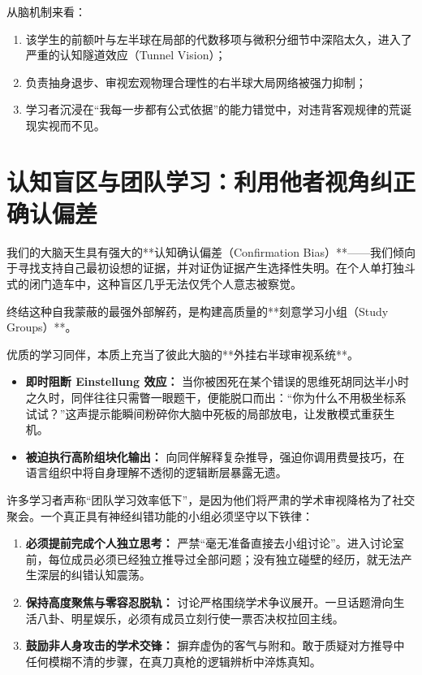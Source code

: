 \documentclass[12pt,a4paper,openany]{ctexbook}
\begin{document}
从脑机制来看：
\begin{enumerate}
    \item 该学生的前额叶与左半球在局部的代数移项与微积分细节中深陷太久，进入了严重的认知隧道效应（Tunnel Vision）；
    \item 负责抽身退步、审视宏观物理合理性的右半球大局网络被强力抑制；
    \item 学习者沉浸在“我每一步都有公式依据”的能力错觉中，对违背客观规律的荒诞现实视而不见。
\end{enumerate}

\section{认知盲区与团队学习：利用他者视角纠正确认偏差}

我们的大脑天生具有强大的**认知确认偏差（Confirmation Bias）**——我们倾向于寻找支持自己最初设想的证据，并对证伪证据产生选择性失明。在个人单打独斗式的闭门造车中，这种盲区几乎无法仅凭个人意志被察觉。

终结这种自我蒙蔽的最强外部解药，是构建高质量的**刻意学习小组（Study Groups）**。

\begin{keypoint}[团队学习的认知神经学增益]
优质的学习同伴，本质上充当了彼此大脑的**外挂右半球审视系统**。
\begin{itemize}
    \item \textbf{即时阻断 Einstellung 效应：} 当你被困死在某个错误的思维死胡同达半小时之久时，同伴往往只需瞥一眼题干，便能脱口而出：“你为什么不用极坐标系试试？”这声提示能瞬间粉碎你大脑中死板的局部放电，让发散模式重获生机。
    \item \textbf{被迫执行高阶组块化输出：} 向同伴解释复杂推导，强迫你调用费曼技巧，在语言组织中将自身理解不透彻的逻辑断层暴露无遗。
\end{itemize}
\end{keypoint}

\begin{warningbox}
许多学习者声称“团队学习效率低下”，是因为他们将严肃的学术审视降格为了社交聚会。一个真正具有神经纠错功能的小组必须坚守以下铁律：
\begin{enumerate}
    \item \textbf{必须提前完成个人独立思考：} 严禁“毫无准备直接去小组讨论”。进入讨论室前，每位成员必须已经独立推导过全部问题；没有独立碰壁的经历，就无法产生深层的纠错认知震荡。
    \item \textbf{保持高度聚焦与零容忍脱轨：} 讨论严格围绕学术争议展开。一旦话题滑向生活八卦、明星娱乐，必须有成员立刻行使一票否决权拉回主线。
    \item \textbf{鼓励非人身攻击的学术交锋：} 摒弃虚伪的客气与附和。敢于质疑对方推导中任何模糊不清的步骤，在真刀真枪的逻辑辨析中淬炼真知。
\end{enumerate}
\end{warningbox}
\end{document}
